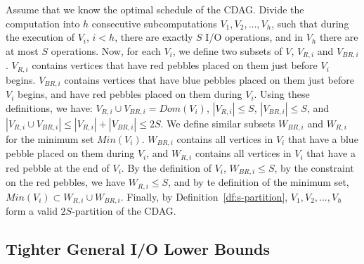 %
%
Assume that we know the optimal schedule of the CDAG. Divide the computation
into $h$ consecutive subcomputations $V_1, V_2, ..., V_h$, such that during the
execution of $V_i$, $i < h$, there are exactly $S$ I/O operations, and in $V_h$
there are at most $S$ operations. Now, for each $V_i$, we define two subsets of
$V$, $V_{R,i}$ and $V_{BR,i}$.
%
%
$V_{R,i}$ contains vertices that have red pebbles placed on them just before
$V_i$ begins.
%
$V_{BR,i}$ contains vertices that have blue pebbles placed on them just before
$V_i$ begins, and have red pebbles placed on them during $V_i$.
%
%
%
%
Using these definitions, we have:  $V_{R,i} \cup V_{BR,i} =
Dom(V_i)$,  $|V_{R,i}| \le S$,  $|V_{BR,i}| \le S$, and
 $|V_{R,i} \cup V_{BR,i}| \le |V_{R,i}| + |V_{BR,i}| \le 2S$.
% 
% 
We define similar subsets $W_{BR,i}$ and $W_{R,i}$ for the minimum set 
$Min(V_i)$.  $W_{BR,i}$ contains all vertices in $V_i$ that have a blue 
pebble placed on them during $V_i$, and  $W_{R,i}$ contains all vertices in 
$V_i$ that have a red pebble at the end of $V_i$. By the definition of $V_i$, 
$W_{BR,i} \le S$, by the constraint on the red pebbles, we have $W_{R,i} \le 
S$, and by te definition of the minimum set,$Min(V_i) \subset W_{R,i} \cup 
W_{BR,i}$.
%
Finally, by Definition~\ref{df:s-partition}, $V_1, V_2, ..., V_h$ form a valid
$2S$-partition of the CDAG. 



\subsection{Tighter General I/O Lower Bounds}
\label{sec:seq-proof}


